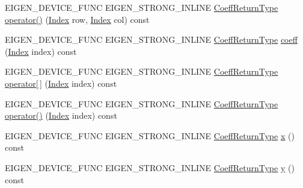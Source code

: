 \begin{DoxyCompactItemize}
\item 
E\+I\+G\+E\+N\+\_\+\+D\+E\+V\+I\+C\+E\+\_\+\+F\+U\+NC E\+I\+G\+E\+N\+\_\+\+S\+T\+R\+O\+N\+G\+\_\+\+I\+N\+L\+I\+NE \mbox{\hyperlink{struct_eigen_1_1internal_1_1true__type}{Coeff\+Return\+Type}} \mbox{\hyperlink{class_eigen_1_1_dense_coeffs_base_3_01_derived_00_01_read_only_accessors_01_4_a29ac34389e098ec963ebb2ebd351335a}{operator()}} (\mbox{\hyperlink{struct_eigen_1_1_eigen_base_a554f30542cc2316add4b1ea0a492ff02}{Index}} row, \mbox{\hyperlink{struct_eigen_1_1_eigen_base_a554f30542cc2316add4b1ea0a492ff02}{Index}} col) const
\item 
E\+I\+G\+E\+N\+\_\+\+D\+E\+V\+I\+C\+E\+\_\+\+F\+U\+NC E\+I\+G\+E\+N\+\_\+\+S\+T\+R\+O\+N\+G\+\_\+\+I\+N\+L\+I\+NE \mbox{\hyperlink{struct_eigen_1_1internal_1_1true__type}{Coeff\+Return\+Type}} \mbox{\hyperlink{class_eigen_1_1_dense_coeffs_base_3_01_derived_00_01_read_only_accessors_01_4_ad52344ad1f42852db71996590d2de0de}{coeff}} (\mbox{\hyperlink{struct_eigen_1_1_eigen_base_a554f30542cc2316add4b1ea0a492ff02}{Index}} index) const
\item 
E\+I\+G\+E\+N\+\_\+\+D\+E\+V\+I\+C\+E\+\_\+\+F\+U\+NC E\+I\+G\+E\+N\+\_\+\+S\+T\+R\+O\+N\+G\+\_\+\+I\+N\+L\+I\+NE \mbox{\hyperlink{struct_eigen_1_1internal_1_1true__type}{Coeff\+Return\+Type}} \mbox{\hyperlink{class_eigen_1_1_dense_coeffs_base_3_01_derived_00_01_read_only_accessors_01_4_ad26422dfa7b2bf859d4304663c36de10}{operator\mbox{[}$\,$\mbox{]}}} (\mbox{\hyperlink{struct_eigen_1_1_eigen_base_a554f30542cc2316add4b1ea0a492ff02}{Index}} index) const
\item 
E\+I\+G\+E\+N\+\_\+\+D\+E\+V\+I\+C\+E\+\_\+\+F\+U\+NC E\+I\+G\+E\+N\+\_\+\+S\+T\+R\+O\+N\+G\+\_\+\+I\+N\+L\+I\+NE \mbox{\hyperlink{struct_eigen_1_1internal_1_1true__type}{Coeff\+Return\+Type}} \mbox{\hyperlink{class_eigen_1_1_dense_coeffs_base_3_01_derived_00_01_read_only_accessors_01_4_a679c7e69917baa1abf2c2f82725ae470}{operator()}} (\mbox{\hyperlink{struct_eigen_1_1_eigen_base_a554f30542cc2316add4b1ea0a492ff02}{Index}} index) const
\item 
E\+I\+G\+E\+N\+\_\+\+D\+E\+V\+I\+C\+E\+\_\+\+F\+U\+NC E\+I\+G\+E\+N\+\_\+\+S\+T\+R\+O\+N\+G\+\_\+\+I\+N\+L\+I\+NE \mbox{\hyperlink{struct_eigen_1_1internal_1_1true__type}{Coeff\+Return\+Type}} \mbox{\hyperlink{class_eigen_1_1_dense_coeffs_base_3_01_derived_00_01_read_only_accessors_01_4_a36fb246141b6ea5ab5289d7eb6afdf6e}{x}} () const
\item 
E\+I\+G\+E\+N\+\_\+\+D\+E\+V\+I\+C\+E\+\_\+\+F\+U\+NC E\+I\+G\+E\+N\+\_\+\+S\+T\+R\+O\+N\+G\+\_\+\+I\+N\+L\+I\+NE \mbox{\hyperlink{struct_eigen_1_1internal_1_1true__type}{Coeff\+Return\+Type}} \mbox{\hyperlink{class_eigen_1_1_dense_coeffs_base_3_01_derived_00_01_read_only_accessors_01_4_af2cb257225cf4348136a37fa9333ccda}{y}} () const

\end{DoxyCompactItemize}
